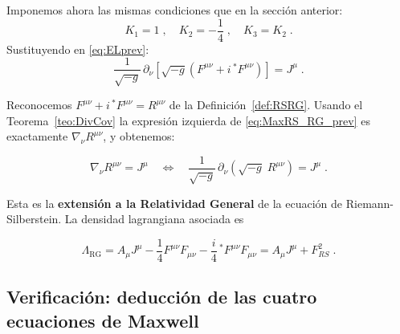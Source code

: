             Imponemos ahora las mismas condiciones que en la sección anterior:
            \begin{equation}\label{eq:CondK}
                K_1 = 1\;,\quad K_2 = -\frac{1}{4}\;,\quad K_3 = K_2\;.
            \end{equation}
            Sustituyendo en \eqref{eq:ELprev}:
            \begin{equation}\label{eq:MaxRS_RG_prev}
                \frac{1}{\sqrt{-g}}\,\partial_{\nu}\!\left[
                \sqrt{-g}\!\left(F^{\mu\nu} + i\,{}^{*}F^{\mu\nu}\right)
                \right]
                = J^{\mu}\;.
            \end{equation}

            Reconocemos $F^{\mu\nu}+i\,{}^{*}F^{\mu\nu} = R^{\mu\nu}$ de la
            Definición~\ref{def:RSRG}.  Usando el Teorema~\ref{teo:DivCov} la expresión
            izquierda de \eqref{eq:MaxRS_RG_prev} es exactamente $\nabla_{\nu}R^{\mu\nu}$,
            y obtenemos:

            \begin{equation}\label{eq:MaxRS_RG}
                \boxed{
                    \nabla_{\nu}R^{\mu\nu} = J^{\mu}
                    \quad\Longleftrightarrow\quad
                    \frac{1}{\sqrt{-g}}\,\partial_{\nu}\!\left(\sqrt{-g}\;R^{\mu\nu}\right)
                    = J^{\mu}\;.
                }
            \end{equation}

            Esta es la \textbf{extensión a la Relatividad General} de la ecuación de
            Riemann-Silberstein.  La densidad lagrangiana asociada es

            \begin{equation}\label{eq:LagFinalRG}
                \Lambda_{\text{RG}}
                    = A_{\mu}J^{\mu}
                    - \frac{1}{4}F^{\mu\nu}F_{\mu\nu}
                    - \frac{i}{4}\,{}^{*}F^{\mu\nu}F_{\mu\nu}
                    = A_{\mu}J^{\mu} + F^2_{RS}\;.
            \end{equation}

        \subsection{Verificación: deducción de las cuatro ecuaciones de Maxwell} \label{subsec:VerificacionRG}

